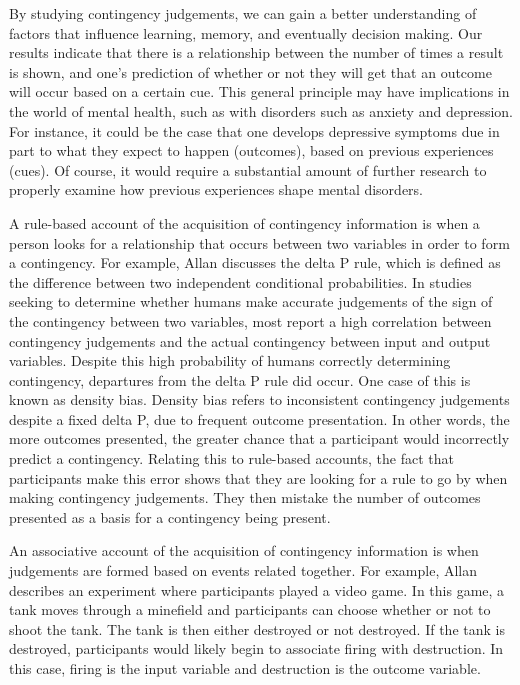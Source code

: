 \documentclass[
  english,
  man,floatsintext]{apa6}
\begin{document}
By studying contingency judgements, we can gain a better understanding of factors that influence learning, memory, and eventually decision making. Our results indicate that there is a relationship between the number of times a result is shown, and one's prediction of whether or not they will get that an outcome will occur based on a certain cue. This general principle may have implications in the world of mental health, such as with disorders such as anxiety and depression. For instance, it could be the case that one develops depressive symptoms due in part to what they expect to happen (outcomes), based on previous experiences (cues). Of course, it would require a substantial amount of further research to properly examine how previous experiences shape mental disorders.

A rule-based account of the acquisition of contingency information is when a person looks for a relationship that occurs between two variables in order to form a contingency. For example, Allan discusses the delta P rule, which is defined as the difference between two independent conditional probabilities. In studies seeking to determine whether humans make accurate judgements of the sign of the contingency between two variables, most report a high correlation between contingency judgements and the actual contingency between input and output variables. Despite this high probability of humans correctly determining contingency, departures from the delta P rule did occur. One case of this is known as density bias. Density bias refers to inconsistent contingency judgements despite a fixed delta P, due to frequent outcome presentation. In other words, the more outcomes presented, the greater chance that a participant would incorrectly predict a contingency. Relating this to rule-based accounts, the fact that participants make this error shows that they are looking for a rule to go by when making contingency judgements. They then mistake the number of outcomes presented as a basis for a contingency being present.

An associative account of the acquisition of contingency information is when judgements are formed based on events related together. For example, Allan describes an experiment where participants played a video game. In this game, a tank moves through a minefield and participants can choose whether or not to shoot the tank. The tank is then either destroyed or not destroyed. If the tank is destroyed, participants would likely begin to associate firing with destruction. In this case, firing is the input variable and destruction is the outcome variable.
\end{document}
